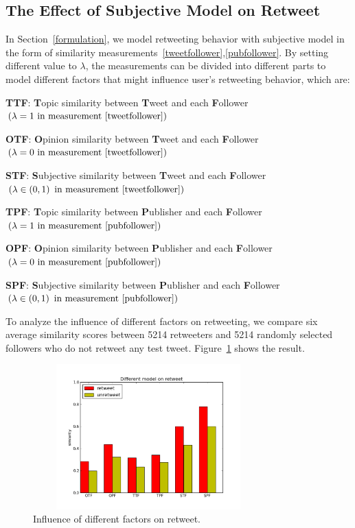 \documentclass{acm_proc_article-sp}
\begin{document}
\subsection{The Effect of Subjective  Model on Retweet}
\label{influence}
In Section~\ref{formulation},  we model retweeting behavior with subjective model in the form of similarity measurements~\ref{tweetfollower},\ref{pubfollower}.
By setting different value to $ \lambda $, the measurements can be divided into different parts to model different factors that might influence user's retweeting behavior, which are:
\begin{itemize*}
\item \textbf{TTF}: \textbf{T}opic similarity between \textbf{T}weet and each \textbf{F}ollower $ \left( \lambda =1  \text{ in measurement~\ref{tweetfollower}} \right) $ 
\item \textbf{OTF}: \textbf{O}pinion similarity between \textbf{T}weet and each \textbf{F}ollower $ \left( \lambda =0 \text{ in measurement~\ref{tweetfollower}} \right) $
\item \textbf{STF}: \textbf{S}ubjective similarity between \textbf{T}weet and each \textbf{F}ollower $ \left( \lambda \in \left( 0,1 \right)   \text{ in measurement~\ref{tweetfollower}} \right) $ 
\item \textbf{TPF}: \textbf{T}opic similarity between \textbf{P}ublisher and each \textbf{F}ollower $ \left( \lambda =1  \text{ in measurement~\ref{pubfollower}}  \right) $ 
\item \textbf{OPF}: \textbf{O}pinion similarity between \textbf{P}ublisher and each \textbf{F}ollower $ \left( \lambda =0 \text{ in measurement~\ref{pubfollower}} \right) $
\item \textbf{SPF}: \textbf{S}ubjective similarity between \textbf{P}ublisher and each \textbf{F}ollower $ \left( \lambda \in \left( 0,1 \right)   \text{ in measurement~\ref{pubfollower}} \right) $
\end{itemize*}
To analyze the influence of different factors on retweeting, we compare six average similarity scores between 5214 retweeters and 5214 randomly selected followers who do not retweet any test tweet. Figure~\ref{fig:graph6} shows the result.
\begin{figure}[htb]
\centering
\includegraphics[width=3.5in,height=2.2in]{component.pdf}
\caption{Influence of different factors on retweet.}
\label{fig:graph6}
\end{figure}
\end{document}
